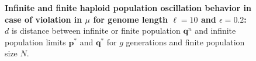 \begin{figure}[H]
\begin{center}
\hspace{5pt}
\hspace{5pt}


\caption{\textbf{Infinite and finite haploid population oscillation behavior in case of violation in $\mu$ for genome length $\ell = 10$ and $\epsilon = 0.2$:} $d$ is
  distance between infinite or finite population ${\bm q}^n$ and infinite
  population limits ${{\bm p}^\ast}$ and ${{\bm q}^{\ast}}$ for $g$ generations and finite population size $N$.}
\label{oscillation_10h_vio_mu_0.2}
\end{center}
\end{figure}

